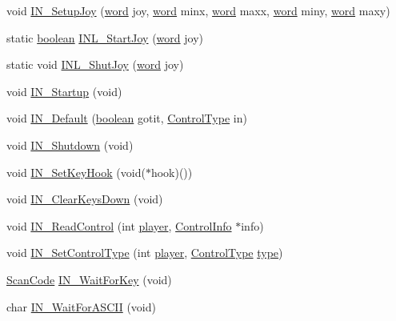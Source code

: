 \begin{DoxyCompactItemize}
\item 
void \hyperlink{ID__IN_8C_a58e132d2bd776ef812d95ee30907cbd5}{IN\_\-SetupJoy} (\hyperlink{ID__HEAD_8H_abad51e07ab6d26bec9f1f786c8d65bcd}{word} joy, \hyperlink{ID__HEAD_8H_abad51e07ab6d26bec9f1f786c8d65bcd}{word} minx, \hyperlink{ID__HEAD_8H_abad51e07ab6d26bec9f1f786c8d65bcd}{word} maxx, \hyperlink{ID__HEAD_8H_abad51e07ab6d26bec9f1f786c8d65bcd}{word} miny, \hyperlink{ID__HEAD_8H_abad51e07ab6d26bec9f1f786c8d65bcd}{word} maxy)
\item 
static \hyperlink{ID__HEAD_8H_a7c6368b321bd9acd0149b030bb8275ed}{boolean} \hyperlink{ID__IN_8C_a9b6ff4a88bfe152f44195609081589bc}{INL\_\-StartJoy} (\hyperlink{ID__HEAD_8H_abad51e07ab6d26bec9f1f786c8d65bcd}{word} joy)
\item 
static void \hyperlink{ID__IN_8C_a9a35bfa212a39d07b87e13af5b740b50}{INL\_\-ShutJoy} (\hyperlink{ID__HEAD_8H_abad51e07ab6d26bec9f1f786c8d65bcd}{word} joy)
\item 
void \hyperlink{ID__IN_8C_a20a23654ead536c7d999b6de31a5168c}{IN\_\-Startup} (void)
\item 
void \hyperlink{ID__IN_8C_ae6921738c0736bb24d7ff5c57f3d676a}{IN\_\-Default} (\hyperlink{ID__HEAD_8H_a7c6368b321bd9acd0149b030bb8275ed}{boolean} gotit, \hyperlink{ID__IN_8H_a8005f1f182fd0248a710ca64f72508d4}{ControlType} in)
\item 
void \hyperlink{ID__IN_8C_a781003199e06bab03bde6ff7051bdcbe}{IN\_\-Shutdown} (void)
\item 
void \hyperlink{ID__IN_8C_ad623321aa9d97c17235d879ddc6544e9}{IN\_\-SetKeyHook} (void($\ast$hook)())
\item 
void \hyperlink{ID__IN_8C_a20251e701cb941d1b39665a9afa51f23}{IN\_\-ClearKeysDown} (void)
\item 
void \hyperlink{ID__IN_8C_ae921141c5b424cfe4cec9d47f13bd2ca}{IN\_\-ReadControl} (int \hyperlink{WL__PLAY_8C_aab35f908015a45224c5de99938b392f0}{player}, \hyperlink{structCursorInfo}{ControlInfo} $\ast$info)
\item 
void \hyperlink{ID__IN_8C_a5a2e56307d6342ad5b7c0b94fbab81ef}{IN\_\-SetControlType} (int \hyperlink{WL__PLAY_8C_aab35f908015a45224c5de99938b392f0}{player}, \hyperlink{ID__IN_8H_a8005f1f182fd0248a710ca64f72508d4}{ControlType} \hyperlink{WL__ACT1_8C_ac6913ebc2a188919d185cadc155a48cd}{type})
\item 
\hyperlink{ID__IN_8H_a92ee9291fc7e992c1662c4e195242f2d}{ScanCode} \hyperlink{ID__IN_8C_a311d56c00631eb35b523f6c934900a7d}{IN\_\-WaitForKey} (void)
\item 
char \hyperlink{ID__IN_8C_a6a8f9f185576515a4d238258440181a7}{IN\_\-WaitForASCII} (void)

\end{DoxyCompactItemize}
